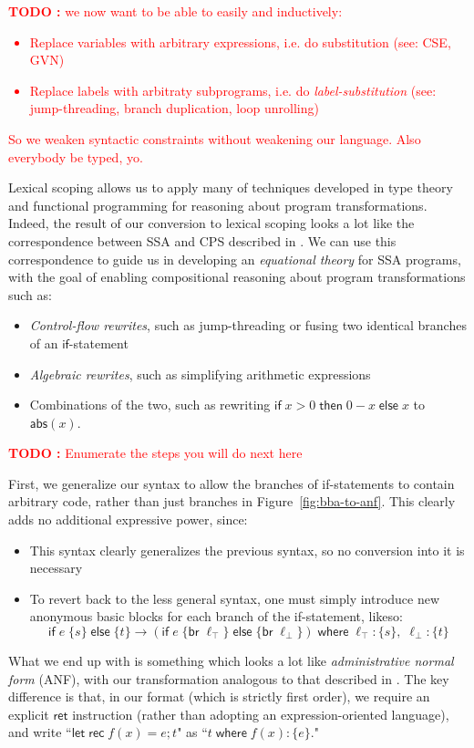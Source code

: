 \documentclass[acmsmall,screen,review]{acmart}
\newcounter{todos}
\newcommand{\TODO}[1]{{
  \stepcounter{todos}
  \begin{center}\large{\textcolor{red}{\textbf{TODO \arabic{todos}:} #1}}\end{center}
}}
\newcommand{\ms}[1]{\ensuremath{\mathsf{#1}}}
\newcommand{\lto}{:}
\newcommand{\where}[2]{#1\;\ms{where}\;#2}
\newcommand{\wbranch}[3]{#1(#2) \lto \{#3\}}
\begin{document}
\TODO{we now want to be able to easily and inductively:
\begin{itemize}
  \item Replace variables with arbitrary expressions, i.e. do substitution (see: CSE, GVN)
  \item Replace labels with arbitraty subprograms, i.e. do \emph{label-substitution} (see:
  jump-threading, branch duplication, loop unrolling)
\end{itemize}
So we weaken syntactic constraints without weakening our language. Also everybody be typed, yo. 
}

Lexical scoping allows us to apply many of techniques developed in type theory
and functional programming for reasoning about program transformations. 
Indeed, the result of our conversion to lexical scoping looks a lot like the correspondence
between SSA and CPS described in \citet{kelsey-95-cps}. We can use this correspondence to guide us
in developing an \textit{equational theory} for SSA programs, with the goal of enabling
compositional reasoning about program transformations such as:
\begin{itemize}
  \item \textit{Control-flow rewrites}, such as jump-threading or fusing two identical branches of
  an \ms{if}-statement
  \item \textit{Algebraic rewrites}, such as simplifying arithmetic expressions
  \item Combinations of the two, such as rewriting $\ms{if}\;x > 0\;\ms{then}\;0 - x\;\ms{else}\;
  x$ to $\ms{abs}(x)$.
\end{itemize}
\TODO{Enumerate the steps you will do next here}

First, we  generalize our syntax to allow the branches
of if-statements to contain arbitrary code, rather than just branches in
Figure~\ref{fig:bba-to-anf}. This clearly adds no additional expressive power, since:
\begin{itemize}
  \item This syntax clearly generalizes the previous syntax, so no conversion into it is necessary
  \item To revert back to the less general syntax, one must simply introduce new anonymous basic
  blocks for each branch of the if-statement, likeso:
  \begin{equation}
    \ms{if}\;e\;\{s\}\;\ms{else}\;\{t\}
    \to (\ms{if}\;e\;\{\ms{br}\;\ell_\top\}\;\ms{else}\;\{\ms{br}\;\ell_\bot\})\;
        \ms{where}\;\ell_\top: \{s\},\;\ell_\bot: \{t\}
  \end{equation}
\end{itemize}
What we end up with is something which looks a lot like \textit{administrative normal form} (ANF),
with our transformation analogous to that described in \citet{chakravarty-functional-ssa-2003}. The
key difference is that, in our format (which is strictly first order), we require an explicit
\ms{ret} instruction (rather than adopting an expression-oriented language), and write
``$\ms{let\;rec}\;f(x) = e; t$" as ``$\where{t}{\wbranch{f}{x}{e}}$."
\end{document}
